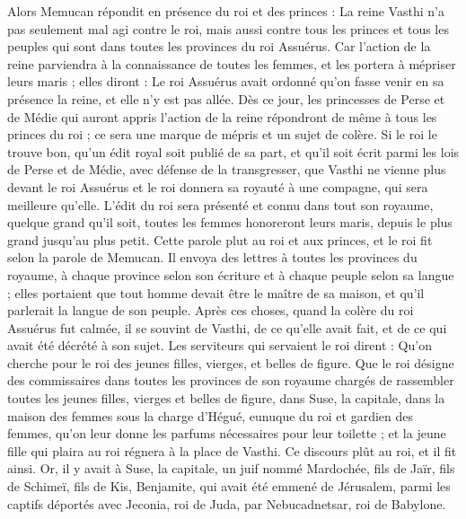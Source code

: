 \begin{multicols}{2}
Alors Memucan répondit en présence du roi et des princes : La reine Vasthi n'a pas seulement mal agi contre le roi, mais aussi contre tous les princes et tous les peuples qui sont dans toutes les provinces du roi Assuérus.
Car l'action de la reine parviendra à la connaissance de toutes les femmes, et les portera à mépriser leurs maris ; elles diront : Le roi Assuérus avait ordonné qu'on fasse venir en sa présence la reine, et elle n'y est pas allée.
Dès ce jour, les princesses de Perse et de Médie qui auront appris l’action de la reine répondront de même à tous les princes du roi ; ce sera une marque de mépris et un sujet de colère.
Si le roi le trouve bon, qu'un édit royal soit publié de sa part, et qu'il soit écrit parmi les lois de Perse et de Médie, avec défense de la transgresser, que Vasthi ne vienne plus devant le roi Assuérus et le roi donnera sa royauté à une compagne, qui sera meilleure qu'elle.
L’édit du roi sera présenté et connu dans tout son royaume, quelque grand qu'il soit, toutes les femmes honoreront leurs maris, depuis le plus grand jusqu'au plus petit.
Cette parole plut au roi et aux princes, et le roi fit selon la parole de Memucan.
Il envoya des lettres à toutes les provinces du royaume, à chaque province selon son écriture et à chaque peuple selon sa langue ; elles portaient que tout homme devait être le maître de sa maison, et qu’il parlerait la langue de son peuple.
\VerseOne{}Après ces choses, quand la colère du roi Assuérus fut calmée, il se souvint de Vasthi, de ce qu'elle avait fait, et de ce qui avait été décrété à son sujet.
Les serviteurs qui servaient le roi dirent : Qu'on cherche pour le roi des jeunes filles, vierges, et belles de figure.
Que le roi désigne des commissaires dans toutes les provinces de son royaume chargés de rassembler toutes les jeunes filles, vierges et belles de figure, dans Suse, la capitale, dans la maison des femmes sous la charge d'Hégué, eunuque du roi et gardien des femmes, qu'on leur donne les parfums nécessaires pour leur toilette ;
et la jeune fille qui plaira au roi régnera à la place de Vasthi. Ce discours plût au roi, et il fit ainsi.
Or, il y avait à Suse, la capitale, un juif nommé Mardochée, fils de Jaïr, fils de Schimeï, fils de Kis, Benjamite,
qui avait été emmené de Jérusalem, parmi les captifs déportés avec Jeconia, roi de Juda, par Nebucadnetsar, roi de Babylone.

\end{multicols}
